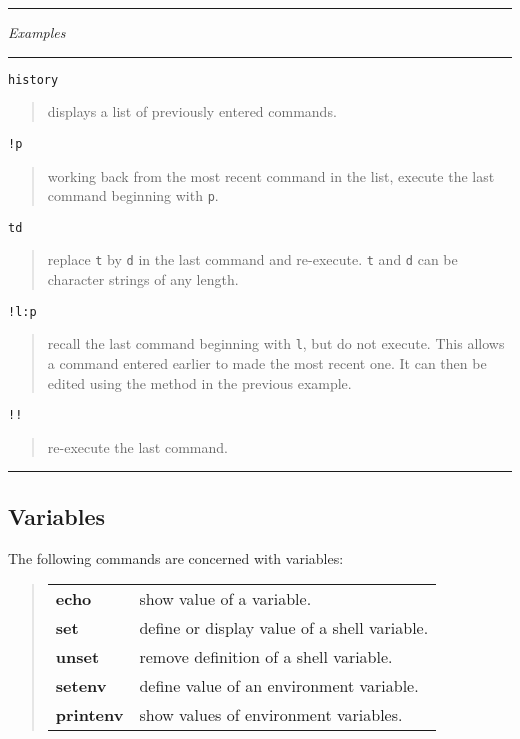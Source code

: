 \documentclass[twoside,11pt,nolof]{starlink}
\providecommand{\example}[2]{\goodbreak
                         \texttt{#1}
                         \vspace*{-4mm}
                         \begin{quote}
                           {\small #2}
                         \end{quote}
                        }
\providecommand{\exbegin}{\begin{center}
                      \rule{18mm}{0.3mm}
                      \emph{Examples}
                      \rule{18mm}{0.3mm}
                      \end{center}
                     }
\providecommand{\exend}{\begin{center}
                    \rule{50mm}{0.3mm}
                    \end{center}
                   }
\begin{document}
\goodbreak

\exbegin

\example{history}
{displays a list of previously entered commands.}

\example{!p}
{working back from the most recent command in the list, execute the last
command beginning with \texttt{p}.}

\example{\wedge t\wedge d}
{replace \texttt{t} by \texttt{d} in the last command and re-execute.
\texttt{t} and \texttt{d} can be character strings of any length.}

\example{!l:p}
{recall the last command beginning with \texttt{l}, but do not execute.
This allows a command entered earlier to made the most recent one.
It can then be edited using the method in the previous example.}

\example{!!}
{re-execute the last command.}

\exend

\subsection{Variables}

The following commands are concerned with variables:
\begin{quote}
\begin{tabular}{lp{67mm}}

\textbf{echo}     & show value of a variable.\\
\textbf{set}      & define or display value of a shell variable.\\
\textbf{unset}    & remove definition of a shell variable.\\
\textbf{setenv}   & define value of an environment variable.\\
\textbf{printenv} & show values of environment variables.

\end{tabular}
\end{quote}
\end{document}
